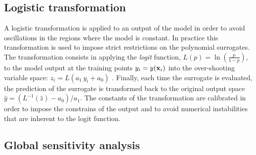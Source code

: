 \documentclass[preprint,12pt]{elsarticle}
\begin{document}



\subsection{Logistic transformation}

A logistic transformation is applied to an output of the model in order to avoid oscillations in the regions where the model is constant. In practice this transformation is used to impose strict restrictions on the polynomial surrogates. %
The transformation consists in applying the \emph{logit} function, $L(p)= \ln \left( \frac{p}{1-p}\right)$, to the model output at the training points $y_i=y(\mathbf{x}_i)$ into the over-shooting variable space: $z_i=L(a_1\,y_i+a_0)$ \cite{simard1998transformation}. %
Finally, each time the surrogate is evaluated, the prediction of the surrogate is transformed back to the original output space $\hat{y}=(L^{-1}(\hat{z})-a_0)/a_1$. The constants of the transformation are calibrated in order to impose the constrains of the output and to avoid numerical instabilities that are inherent to the logit function.



\subsection{Global sensitivity analysis}
\end{document}
